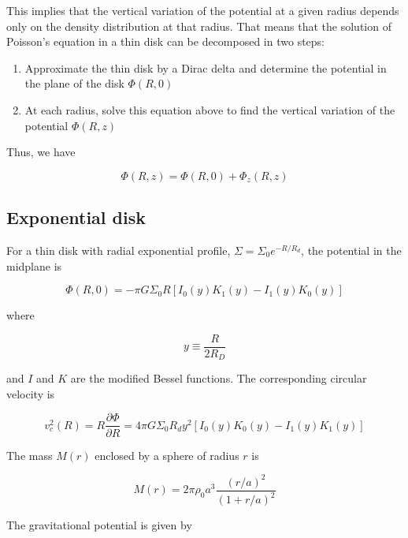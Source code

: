This implies that the vertical variation of the potential at a given radius depends only on the density distribution at that radius. That means that the solution of Poisson's equation in a thin disk can be decomposed in two steps: 

\begin{enumerate}
\item Approximate the thin disk by a Dirac delta and determine the potential in the plane of the disk $\varPhi(R,0)$
\item At each radius, solve this equation above to find the vertical variation of the potential $\varPhi(R,z)$ 
\end{enumerate}

Thus, we have 

\begin{equation}
\varPhi(R,z) = \varPhi(R,0) + \varPhi_z(R,z)
\end{equation}

\subsection{Exponential disk}

For a thin disk with radial exponential profile, $\Sigma = \Sigma_0 e^{-R/R_d}$, the potential in the midplane is 

\begin{equation}
\varPhi(R,0) = -\pi G\Sigma_0 R \left[ I_0(y) K_1(y) - I_1(y) K_0(y) \right]
\end{equation}

where 

\begin{equation}
y \equiv \frac{R}{2R_D} 
\end{equation}

and $I$ and $K$ are the modified Bessel functions. The corresponding circular velocity is 

\begin{equation}
v^2_c(R) = R\frac{\partial\varPhi}{\partial R}  = 4\pi G\Sigma_0 R_d y^2 \left[ I_0(y) K_0(y) - I_1(y) K_1(y) \right]
\end{equation}

The mass $M(r)$ enclosed by a sphere of radius $r$ is

\begin{equation}
\boxed{
M(r) = 2\pi \rho_0 a^3  \frac{(r/a)^2}{(1+r/a)^2}
}
\end{equation}


The gravitational potential is given by 

